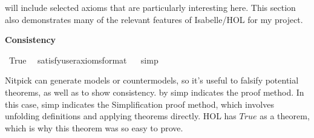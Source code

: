 \begin{isabellebody}
\begin{isamarkuptext}
will include selected axioms that are particularly interesting here. This section also demonstrates many
of the relevant features of Isabelle/HOL for my project.%
\end{isamarkuptext}\isamarkuptrue%
%
\begin{isamarkuptext}%
\textbf{Consistency}%
\end{isamarkuptext}\isamarkuptrue%
\isamarkupfalse%
\ True\ \isamarkupfalse%
\ {\isacharbrackleft}satisfy{\isacharcomma}user{\isacharunderscore}axioms{\isacharcomma}format{\isacharequal}{}{\isacharbrackright}%
\isadelimproof
\ %
\endisadelimproof
%
\isatagproof
{}\isamarkupfalse%
\ simp\isanewline
%
\isanewline
%
%
\endisatagproof
{\isafoldproof}%
%
\isadelimproof
%
\endisadelimproof
%
\begin{isamarkuptext}%
Nitpick \cite{nitpick} can generate models or countermodels, so it's useful to falsify potential
theorems, as well as to show consistency. {\color{red} by simp} indicates the proof method. In this 
case, {\color{red} simp} indicates the Simplification proof method, which involves unfolding definitions
and applying theorems directly. HOL has $True$ as a theorem, which is why this theorem was so easy to prove.%
\end{isamarkuptext}\isamarkuptrue%
%
\isadelimtheory
%
\endisadelimtheory
%
\isatagtheory
%
\endisatagtheory
{\isafoldtheory}%
%
\isadelimtheory
%
\endisadelimtheory
%
\end{isabellebody}%
\endinput

